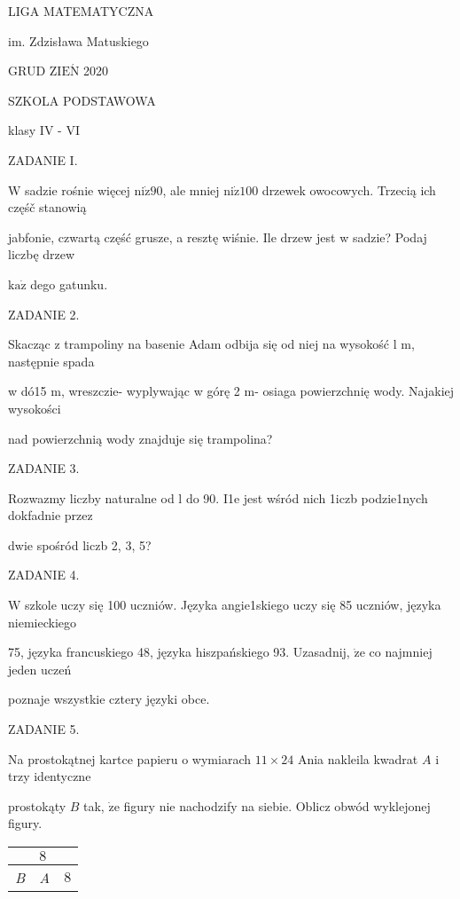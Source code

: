 \documentclass[a4paper,12pt]{article}
\begin{document}
LIGA MATEMATYCZNA

im. Zdzisława Matuskiego

GRUD Z$\mathrm{I}\mathrm{E}\acute{\mathrm{N}}$ 2020

SZKOLA PODSTAWOWA

klasy IV - VI

ZADANIE I.

$\mathrm{W}$ sadzie rośnie więcej $\mathrm{n}\mathrm{i}\dot{\mathrm{z}}90$, ale mniej $\mathrm{n}\mathrm{i}\dot{\mathrm{z}}100$ drzewek owocowych. Trzecią ich częśč stanowią

jabfonie, czwartą część grusze, a resztę wiśnie. Ile drzew jest w sadzie? Podaj liczbę drzew

$\mathrm{k}\mathrm{a}\dot{\mathrm{z}}$ dego gatunku.

ZADANIE 2.

Skacząc z trampoliny na basenie Adam odbija się od niej na wysokość l $\mathrm{m}$, następnie spada

w dó15 $\mathrm{m}$, wreszczie- wyplywając w górę 2 m- osiaga powierzchnię wody. Najakiej wysokości

nad powierzchnią wody znajduje się trampolina?

ZADANIE 3.

Rozwazmy liczby naturalne od l do 90. I1e jest wśród nich 1iczb podzie1nych dokfadnie przez

dwie spośród liczb 2, 3, 5?

ZADANIE 4.

$\mathrm{W}$ szkole uczy się 100 uczniów. Języka angie1skiego uczy się 85 uczniów, języka niemieckiego

75, języka francuskiego 48, języka hiszpańskiego 93. Uzasadnij, $\dot{\mathrm{z}}\mathrm{e}$ co najmniej jeden uczeń

poznaje wszystkie cztery języki obce.

ZADANIE 5.

Na prostokątnej kartce papieru o wymiarach $11\times 24$ Ania nakleila kwadrat $A$ i trzy identyczne

prostokąty $B$ tak, $\dot{\mathrm{z}}\mathrm{e}$ figury nie nachodzify na siebie. Oblicz obwód wyklejonej figury.
\begin{center}
\begin{tabular}{|l|l|l|}
\hline
\multicolumn{1}{|l|}{}&	\multicolumn{1}{|l|}{$8$}&	\multicolumn{1}{|l|}{}	\\
\hline
\multicolumn{1}{|l|}{{\it B}}&	\multicolumn{1}{|l|}{{\it A}}&	\multicolumn{1}{|l|}{$8$}	\\
\hline
\end{tabular}

\end{center}
\end{document}
